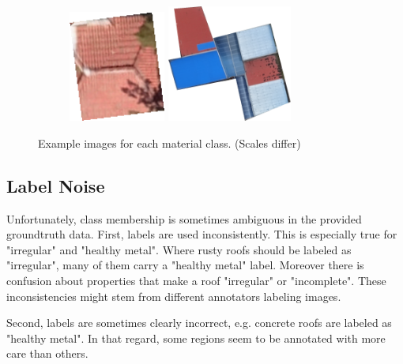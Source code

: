 \documentclass[11pt]{article}
\begin{document}
\begin{figure}
\begin{subfigure}[c]{0.32\textwidth}
		\end{subfigure}
		\begin{subfigure}[c]{0.32\textwidth}
			\centering
			\includegraphics[width=0.35\textwidth]{figures/mat_examples/other1.png}		
			\includegraphics[width=0.45\textwidth]{figures/mat_examples/other2.png}
		\end{subfigure}
	\caption{Example images for each material class. (Scales differ)}
	\label{fig:mat_examples}
	\end{figure}

	\subsection{Label Noise}
	\label{sec:data_noise}
	Unfortunately, class membership is sometimes ambiguous in the provided groundtruth data. 
	First, labels are used inconsistently. This is especially true for "irregular" and "healthy metal". Where rusty roofs should be labeled as "irregular", many of them carry a "healthy metal" label.
	Moreover there is confusion about properties that make a roof "irregular" or "incomplete".
	These inconsistencies might stem from different annotators labeling images.
	
	Second, labels are sometimes clearly incorrect, e.g. concrete roofs are labeled as "healthy metal". In that regard, some regions seem to be annotated with more care than others. 
	
\end{document}
